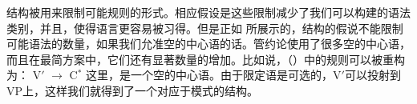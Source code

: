 \xbarc 结构被用来限制可能规则的形式。相应假设是这些限制减少了我们可以构建的语法类别，并且，使得语言更容易被习得。但是正如 \citet{KP90a}所展示的，\xbarc 结构的假说不能限制可能语法的数量，如果我们允准空的中心语的话。管约论使用了很多空的中心语，而且在最简方案\indexmpc 中，它们还有显著数量的增加。比如说，（）中的规则可以被重构为：
\ea
V$'$ $\to$ \vnull C$^*$
\z
这里，\vnullc 是一个空的中心语。由于限定语是可选的，V$'$可以投射到VP上，这样我们就得到了一个对应于\xbarc 模式的结构。

